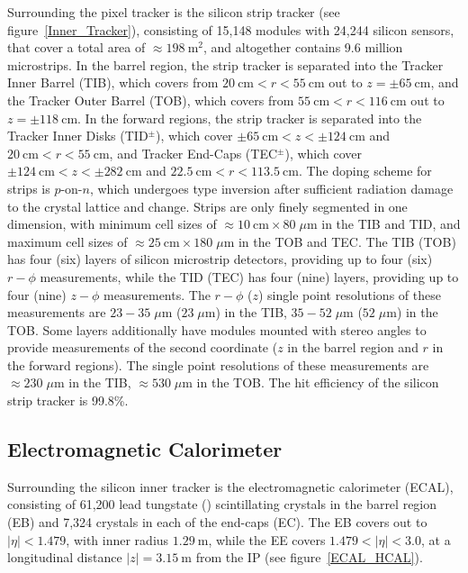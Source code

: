 Surrounding the pixel tracker is the silicon strip tracker (see figure~\ref{Inner_Tracker}), consisting of 15,148 modules with 24,244 silicon sensors, that cover a total area of $\approx \SI{198}{\m \squared}$, and altogether contains 9.6 million microstrips.
In the barrel region, the strip tracker is separated into the Tracker Inner Barrel (TIB), which covers from $\SI{20}{\cm} < r < \SI{55}{\cm}$ out to $z = \pm \SI{65}{\cm}$, and the Tracker Outer Barrel (TOB), which covers from $\SI{55}{\cm} < r < \SI{116}{\cm}$ out to $z = \pm \SI{118}{\cm}$.
In the forward regions, the strip tracker is separated into the Tracker Inner Disks (TID$^\pm$), which cover $\pm\SI{65}{\cm} < z < \pm\SI{124}{\cm}$ and $\SI{20}{\cm} < r < \SI{55}{\cm}$, and Tracker End-Caps (TEC$^\pm$), which cover $\pm\SI{124}{\cm} < z < \pm\SI{282}{\cm}$ and $\SI{22.5}{\cm} < r < \SI{113.5}{\cm}$.
The doping scheme for strips is $p$-on-$n$, which undergoes type inversion after sufficient radiation damage to the crystal lattice and change.
Strips are only finely segmented in one dimension, with minimum cell sizes of  $\approx \SI{10}{\cm} \times 80 \; \mu \si{\m}$ in the TIB and TID, and maximum cell sizes of $\approx \SI{25}{\cm} \times 180 \; \mu \si{\m}$ in the TOB and TEC.
The TIB (TOB) has four (six) layers of silicon microstrip detectors, providing up to four (six) $r-\phi$ measurements, while the TID (TEC) has four (nine) layers, providing up to four (nine) $z-\phi$ measurements.
The $r-\phi$ ($z$) single point resolutions of these measurements are $23-35 \; \mu \si{\m}$ ($23 \; \mu \si{\m}$) in the TIB, $35-52 \; \mu \si{\m}$ ($52 \; \mu \si{\m}$) in the TOB.
Some layers additionally have modules mounted with stereo angles to provide measurements of the second coordinate ($z$ in the barrel region and $r$ in the forward regions).
The single point resolutions of these measurements are $\approx 230 \; \mu \si{\m}$ in the TIB, $\approx 530 \; \mu \si{\m}$ in the TOB.
The hit efficiency of the silicon strip tracker is 99.8\%.

\subsection{Electromagnetic Calorimeter}
Surrounding the silicon inner tracker is the electromagnetic calorimeter (ECAL), consisting of 61,200 lead tungstate () scintillating crystals in the barrel region (EB) and 7,324 crystals in each of the end-caps (EC).
The EB covers out to $\vert \eta \vert < 1.479$, with inner radius $\SI{1.29}{\m}$, while the EE covers $1.479 < \vert \eta \vert < 3.0$, at a longitudinal distance $\vert z \vert = \SI{3.15}{\m}$ from the IP (see figure~\ref{ECAL_HCAL}).

